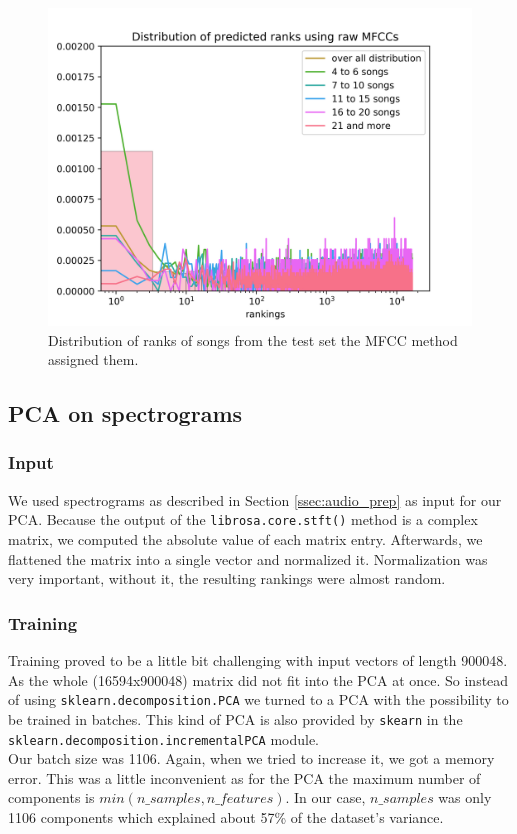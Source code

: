 \begin{figure}[h]
    \centering
	\includegraphics[width=120mm]{./img/mfcc_graph.png}
	\caption{Distribution of ranks of songs from the test set the MFCC method assigned them.}
	\label{fig:mfcc_graph}
\end{figure}


\subsection {PCA on spectrograms}

\subsubsection{Input}
We used spectrograms as described in Section \ref{ssec:audio_prep} as input for our PCA. Because the output of the \texttt{librosa.core.stft()} method is a complex matrix, we computed the absolute value of each matrix entry. Afterwards, we flattened the matrix into a single vector and normalized it. Normalization was very important, without it, the resulting rankings were almost random.

\subsubsection{Training}
Training proved to be a little bit challenging with input vectors of length 900048. As the whole (16594x900048) matrix did not fit into the PCA at once. So instead of using \texttt{sklearn.decomposition.PCA} we turned to a PCA with the possibility to be trained in batches. This kind of PCA is also provided by \texttt{skearn} in the \texttt{sklearn.decomposition.incrementalPCA} module. \\ Our batch size was 1106. Again, when we tried to increase it, we got a memory error. This was a little inconvenient as for the PCA the maximum number of components is $min(n\_samples, n\_features)$. In our case, $n\_samples$ was only 1106 components which explained about 57\% of the dataset's variance.
